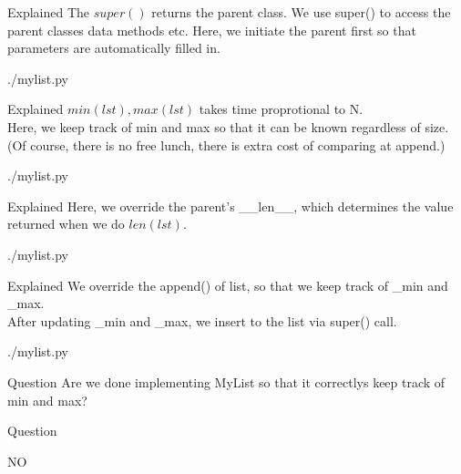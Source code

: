 \documentclass{beamer}
\begin{document}
\begin{frame}{Explained}
  The $super()$ returns the parent class. We use super() to access the parent
  classes data methods etc. Here, we initiate the parent first so that
  parameters are automatically filled in.
  \begin{lstinputlisting}[firstline=1, lastline=4]
  {./mylist.py}
\end{lstinputlisting}
\end{frame}

\begin{frame}{Explained}
  $min(lst), max(lst)$ takes time proprotional to N.\\
  Here, we keep track of min and max so that it can be known regardless of
  size.\\
  (Of course, there is no free lunch, there is extra cost of comparing at append.)
  \begin{lstinputlisting}[firstline=1, lastline=6]
  {./mylist.py}
  \end{lstinputlisting}
\end{frame}

\begin{frame}{Explained}
  Here, we override the parent's \_\_len\_\_, which determines the value
  returned when we do $len(lst)$.
  \begin{lstinputlisting}[firstline=7, lastline=9]
    {./mylist.py}
  \end{lstinputlisting}
\end{frame}

\begin{frame}{Explained}
  We override the append() of list, so that we keep track of \_min and \_max.\\
  After updating \_min and \_max, we insert to the list via super() call.
  \begin{lstinputlisting}[firstline=11, lastline=16]
    {./mylist.py}
  \end{lstinputlisting}
\end{frame}

\begin{frame}{Question}
  Are we done implementing MyList so that it correctlys keep track of min and max?
\end{frame}

\begin{frame}{Question}
  \begin{center}
    NO
  \end{center}
\end{frame}
\end{document}
